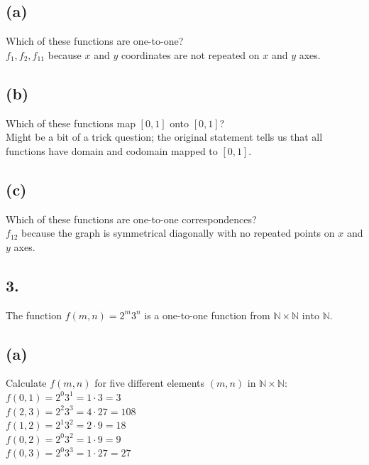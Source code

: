 \documentclass[11pt]{article}
\begin{document}
\subsection*{(a)}
\begin{center}
Which of these functions are one-to-one?\\
\hfill \break
$f_1, f_2, f_{11}$ because $x$ and $y$ coordinates are not repeated on $x$ and $y$ axes.
\end{center}

\hfill \break
\subsection*{(b)}
\begin{center}
Which of these functions map $[0,1]$ onto $[0,1]$?\\
\hfill \break
Might be a bit of a trick question; the original statement tells us that all functions have domain and codomain mapped to $[0,1]$.
\end{center}

\subsection*{(c)}
\begin{center}
Which of these functions are one-to-one correspondences?\\
\hfill \break
$f_{12}$ because the graph is symmetrical diagonally with no repeated points on $x$ and $y$ axes.
\end{center}
%
%
\subsection*{3.}
\begin{center}
The function $f(m,n) = 2^{m}3^{n}$ is a one-to-one function from $\mathbb{N} \times \mathbb{N} \text{ into } \mathbb{N}$.
\end{center}

\subsection*{(a)}
\begin{center}
Calculate $f(m,n)$ for five different elements $(m,n)$ in $\mathbb{N} \times \mathbb{N}$:\\
\hfill \break
$f(0,1) = 2^{0}3^{1} = 1 \cdot 3 = 3$\\
$f(2,3) = 2^{2}3^{3} = 4 \cdot 27 = 108$\\
$f(1,2) = 2^{1}3^{2} = 2 \cdot 9 = 18$\\
$f(0,2) = 2^{0}3^{2} = 1 \cdot 9 = 9$\\
$f(0,3) = 2^{0}3^{3} = 1 \cdot 27 = 27$ 
\end{center}
%
%
\end{document}
